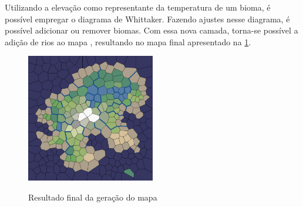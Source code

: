 Utilizando a elevação como representante da temperatura de um bioma, é possível empregar o diagrama de Whittaker. Fazendo ajustes nesse diagrama, é possível adicionar ou remover biomas. Com essa nova camada, torna-se possível a adição de rios ao mapa \cite{amitp2010}, resultando no mapa final apresentado na \cref{fig:biomes}.

\begin{figure}[ht]
	\caption{Resultado final da geração do mapa}
	\centering
	\includegraphics[width=0.5\textwidth]{figures/biomes.png}
	\label{fig:biomes}
\end{figure}
